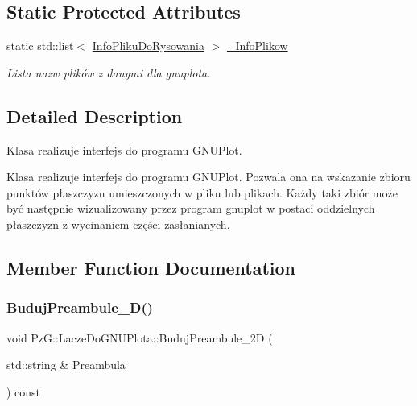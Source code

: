 \subsection*{Static Protected Attributes}
\begin{DoxyCompactItemize}
\item 
static std\+::list$<$ \hyperlink{classPzG_1_1InfoPlikuDoRysowania}{Info\+Pliku\+Do\+Rysowania} $>$ \hyperlink{classPzG_1_1LaczeDoGNUPlota_a1916c5a6fecfb3554e9d5204b2f2086c}{\+\_\+\+Info\+Plikow}
\begin{DoxyCompactList}\small\item\em Lista nazw plików z danymi dla {\itshape gnuplota}. \end{DoxyCompactList}\end{DoxyCompactItemize}


\subsection{Detailed Description}
Klasa realizuje interfejs do programu G\+N\+U\+Plot. 

Klasa realizuje interfejs do programu G\+N\+U\+Plot. Pozwala ona na wskazanie zbioru punktów płaszczyzn umieszczonych w pliku lub plikach. Każdy taki zbiór może być następnie wizualizowany przez program gnuplot w postaci oddzielnych płaszczyzn z wycinaniem części zasłanianych. 

\subsection{Member Function Documentation}
\mbox{\label{classPzG_1_1LaczeDoGNUPlota_a0ac655ff1934abb69ea668cd92ae77ec}} 
\subsubsection{\texorpdfstring{Buduj\+Preambule\+\_\+D()}{BudujPreambule\_2D()}}
{\footnotesize\ttfamily void Pz\+G\+::\+Lacze\+Do\+G\+N\+U\+Plota\+::\+Buduj\+Preambule\+\_\+2D (\begin{DoxyParamCaption}\item[{std\+::string \&}]{Preambula }\end{DoxyParamCaption}) const\hspace{0.3cm}{\ttfamily [protected]}}



